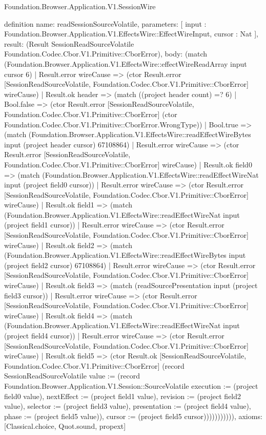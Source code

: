\begin{lexlean}{Foundation.Browser.Application.V1.SessionWire}
\begin{semanticmodule}
definition{
  name: readSessionSourceVolatile,
  parameters: [
    input : Foundation.Browser.Application.V1.EffectsWire::EffectWireInput,
    cursor : Nat
  ],
  result: (Result SessionReadSourceVolatile Foundation.Codec.Cbor.V1.Primitive::CborError),
  body: (match (Foundation.Browser.Application.V1.EffectsWire::effectWireReadArray input cursor 6)
    | Result.error wireCause => (ctor Result.error [SessionReadSourceVolatile, Foundation.Codec.Cbor.V1.Primitive::CborError] wireCause)
    | Result.ok header => (match ((project header count) =? 6)
      | Bool.false => (ctor Result.error [SessionReadSourceVolatile, Foundation.Codec.Cbor.V1.Primitive::CborError] (ctor Foundation.Codec.Cbor.V1.Primitive::CborError.WrongType))
      | Bool.true => (match (Foundation.Browser.Application.V1.EffectsWire::readEffectWireBytes input (project header cursor) 67108864)
        | Result.error wireCause => (ctor Result.error [SessionReadSourceVolatile, Foundation.Codec.Cbor.V1.Primitive::CborError] wireCause)
        | Result.ok field0 => (match (Foundation.Browser.Application.V1.EffectsWire::readEffectWireNat input (project field0 cursor))
          | Result.error wireCause => (ctor Result.error [SessionReadSourceVolatile, Foundation.Codec.Cbor.V1.Primitive::CborError] wireCause)
          | Result.ok field1 => (match (Foundation.Browser.Application.V1.EffectsWire::readEffectWireNat input (project field1 cursor))
            | Result.error wireCause => (ctor Result.error [SessionReadSourceVolatile, Foundation.Codec.Cbor.V1.Primitive::CborError] wireCause)
            | Result.ok field2 => (match (Foundation.Browser.Application.V1.EffectsWire::readEffectWireBytes input (project field2 cursor) 67108864)
              | Result.error wireCause => (ctor Result.error [SessionReadSourceVolatile, Foundation.Codec.Cbor.V1.Primitive::CborError] wireCause)
              | Result.ok field3 => (match (readSourcePresentation input (project field3 cursor))
                | Result.error wireCause => (ctor Result.error [SessionReadSourceVolatile, Foundation.Codec.Cbor.V1.Primitive::CborError] wireCause)
                | Result.ok field4 => (match (Foundation.Browser.Application.V1.EffectsWire::readEffectWireNat input (project field4 cursor))
                  | Result.error wireCause => (ctor Result.error [SessionReadSourceVolatile, Foundation.Codec.Cbor.V1.Primitive::CborError] wireCause)
                  | Result.ok field5 => (ctor Result.ok [SessionReadSourceVolatile, Foundation.Codec.Cbor.V1.Primitive::CborError] (record SessionReadSourceVolatile {value := (record Foundation.Browser.Application.V1.Session::SourceVolatile {execution := (project field0 value), nextEffect := (project field1 value), revision := (project field2 value), selector := (project field3 value), presentation := (project field4 value), phase := (project field5 value)}), cursor := (project field5 cursor)})))))))))),
  axioms: [Classical.choice, Quot.sound, propext]
}


\end{semanticmodule}
\end{lexlean}
